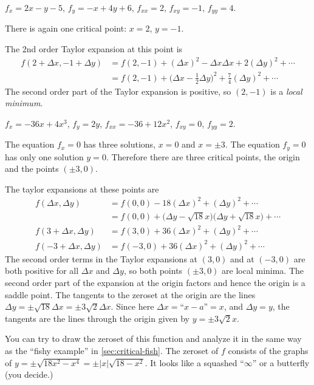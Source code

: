 \item[{\bfseries(V6.1d)}]

$f_x = 2x-y-5$, $f_y = -x+4y+6$, $f_{xx} = 2$, $f_{xy}=-1$, $f_{yy}=4$.

There is again one critical point: $x=2$, $y=-1$.

The 2nd order Taylor expansion at this point is
\begin{align*}
f(2+\Delta x, -1+\Delta y)
&= f(2, -1) + (\Delta x)^2 - \Delta x \Delta x
            + 2(\Delta y)^2 +\cdots\\
&= f(2, -1) + \bigl(\Delta x-\tfrac12\Delta y\bigr)^{2}
            +\tfrac74(\Delta y)^2+\cdots
\end{align*}
The second order part of the Taylor expansion is positive, so
$(2, -1)$ is a \emph{local minimum}.

\bigskip

\item[{\bfseries(V6.1e)}]

$f_x = -36x+4x^3$, $f_y = 2y$, $f_{xx} = -36+12x^2$, $f_{xy}=0$,
$f_{yy}=2$.

The equation $f_x=0$ has three solutions, $x=0$ and $x=\pm3$.
The equation $f_y=0$ has only one solution $y=0$.
Therefore there are three critical points, the origin and the points
$(\pm 3,0)$.

The taylor expansions at these points are
\begin{align*}
    f(\Delta x, \Delta y)
    &= f(0,0) -18 (\Delta x)^2 + (\Delta y)^2 + \cdots \\
    &= f(0,0) + \bigl(\Delta y-\sqrt{18} x\bigr)\bigl(\Delta y+\sqrt{18} x\bigr)
              + \cdots \\
    f(3+\Delta x, \Delta y)
    &= f(3,0) +36 (\Delta x)^2 + (\Delta y)^2 + \cdots \\
    f(-3+\Delta x, \Delta y)
    &= f(-3,0) +36 (\Delta x)^2 + (\Delta y)^2 + \cdots
\end{align*}
The second order terms in the Taylor expansions at $(3,0)$ and at
$(-3,0)$ are both positive for all $\Delta x$ and $\Delta y$, so both
points $(\pm3, 0)$ are local minima.  The second order part of the
expansion at the origin factors and hence the origin is a saddle
point.  The tangents to the zeroset at the origin are the lines
$\Delta y = \pm \sqrt{18}\Delta x = \pm 3\sqrt2 \Delta x$.  Since here
$\Delta x = \text{``}x-a\text{''} = x$, and $\Delta y = y$, the
tangents are the lines through the origin given by $y=\pm 3\sqrt2 x$.

You can try to draw the zeroset of this function and analyze it in the
same way as the ``fishy example'' in \ref{sec:critical-fish}.  The
zeroset of $f$ consists of the graphs of $y = \pm \sqrt{18x^2-x^4} =
\pm |x|\sqrt{18-x^2}$.
It looks like a squashed ``$\infty$'' or a butterfly (you decide.)
\bigskip

